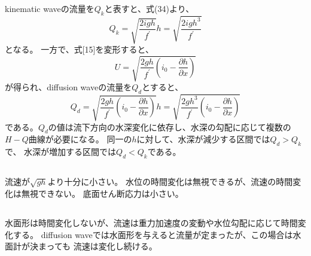 \documentclass[a4paper]{jsarticle}
\begin{document}
\subsection{}
kinematic waveの流量を$Q_k$と表すと、式(34)より、
\begin{equation}
  Q_k = \sqrt{\frac{2 i g h}{f^{\prime}}} h
  = \sqrt{\frac{2 i g h^3}{f^{\prime}}}
\end{equation}
となる。
一方で、式[15]を変形すると、
\begin{equation}
  U = \sqrt{\frac{2 g h}{f^{\prime}}
  \left(i_0 - \frac{\partial h}{\partial x}\right)}
\end{equation}
が得られ、diffusion waveの流量を$Q_d$とすると、
\begin{equation}
  Q_d = \sqrt{\frac{2 g h}{f^{\prime}}
  \left(i_0 - \frac{\partial h}{\partial x}\right)} h
  = \sqrt{\frac{2 g h^3}{f^{\prime}}
  \left(i_0 - \frac{\partial h}{\partial x}\right)}
\end{equation}
である。$Q_d$の値は流下方向の水深変化に依存し、水深の勾配に応じて複数の
$H-Q$曲線が必要になる。
同一の$h$に対して、水深が減少する区間では$Q_d > Q_k$で、
水深が増加する区間では$Q_d < Q_k$である。

\subsection{}
流速が$\sqrt{gh}$より十分に小さい。
水位の時間変化は無視できるが、流速の時間変化は無視できない。
底面せん断応力は小さい。
\subsection{}
水面形は時間変化しないが、流速は重力加速度の変動や水位勾配に応じて時間変化する。
diffusion waveでは水面形を与えると流量が定まったが、この場合は水面計が決まっても
流速は変化し続ける。
\end{document}
